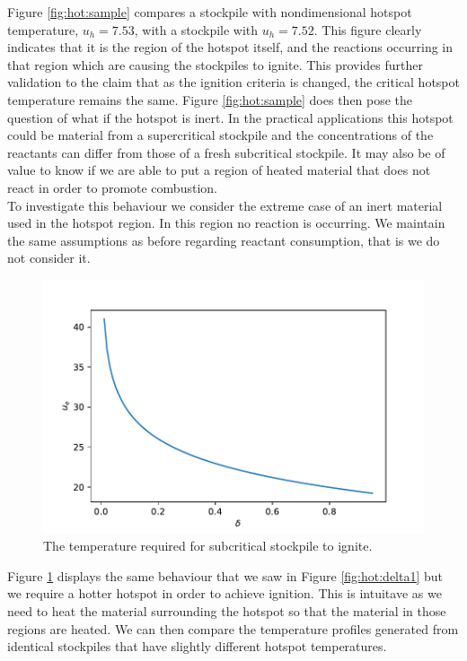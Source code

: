 Figure \ref{fig:hot:sample} compares a stockpile with nondimensional hotspot temperature, $u_h=7.53$, with a stockpile with $u_h=7.52$. This figure clearly indicates that it is the region of the hotspot itself, and the reactions occurring in that region which are causing the stockpiles to ignite. This provides further validation to the claim that as the ignition criteria is changed, the critical hotspot temperature remains the same. Figure \ref{fig:hot:sample} does then pose the question of what if the hotspot is inert. In the practical applications this hotspot could be material from a supercritical stockpile and the concentrations of the reactants can differ from those of a fresh subcritical stockpile. It may also be of value to know if we are able to put a region of heated material that does not react in order to promote combustion.\\

To investigate this behaviour we consider the extreme case of an inert material used in the hotspot region. In this region no reaction is occurring. We maintain the same assumptions as before regarding reactant consumption, that is we do not consider it.\\

\begin{figure}[h!]
\centering
\includegraphics[width=\linewidth]{figures/NDA/Hotspot/delta_inert1.pdf}  
\caption{The temperature required for subcritical stockpile to ignite.}
\label{fig:hot:delta_inert}
\end{figure} 

Figure \ref{fig:hot:delta_inert} displays the same behaviour that we saw in Figure \ref{fig:hot:delta1} but we require a hotter hotspot in order to achieve ignition. This is intuitave as we need to heat the material surrounding the hotspot so that the material in those regions are heated. We can then compare the temperature profiles generated from identical stockpiles that have slightly different hotspot temperatures. 

